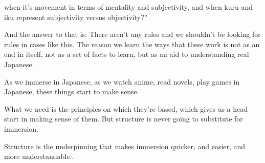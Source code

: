 when it's movement in terms of mentality and subjectivity, and when kuru and iku represent subjectivity versus objectivity?”

And the answer to that is: There aren't any rules and we shouldn't be looking for rules in cases like this. The reason we learn the ways that these work is not as an end in itself, not as a set of facts to learn, but as an aid to understanding real Japanese.

As we immerse in Japanese, as we watch anime, read novels, play games in Japanese, these things start to make sense. {}

What we need is the principles on which they're based, which gives us a head start in making sense of them. But structure is never going to substitute for immersion.

Structure is the underpinning that makes immersion quicker, and easier, and more understandable..

\stopsectionlevel
